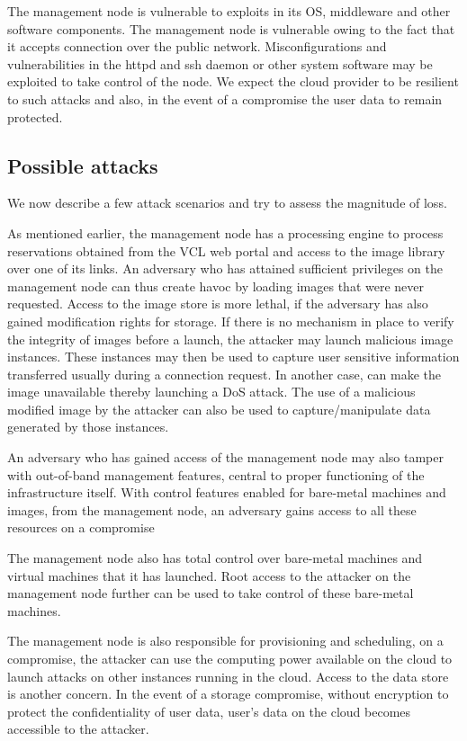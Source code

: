 \documentclass[10pt,twocolumn,pdftex]{article}
\begin{document}
The management node is vulnerable to exploits in its OS, middleware and other software components. The management node is vulnerable owing to the fact that it accepts connection over the public network. Misconfigurations and vulnerabilities in the httpd and ssh daemon or other system software may be exploited to take control of the node. We expect the cloud provider to be resilient to such attacks and also, in the event of a compromise the user data to remain protected.
\subsection{Possible attacks}
We now describe a few attack scenarios and try to assess the magnitude of loss.

As mentioned earlier, the management node has a processing engine to process reservations obtained from the VCL web portal and access to the image library over one of its links. An adversary who has attained sufficient privileges on the management node can thus create havoc by loading images that were never requested. Access to the image store is more lethal, if the adversary has also gained modification rights for storage. If there is no mechanism in place to verify the integrity of images before a launch, the attacker may launch malicious image instances. These instances may then be used to capture user sensitive information transferred usually during a connection request. In another case, can make the image unavailable thereby launching a DoS attack. The use of a malicious modified image by the attacker can also be used to capture/manipulate data generated by those instances.

An adversary who has gained access of the management node may also tamper with out-of-band management features, central to proper functioning of the infrastructure itself. With control features enabled for bare-metal machines and images, from the management node, an adversary gains access to all these resources on a compromise

The management node also has total control over bare-metal machines and virtual machines that it has launched. Root access to the attacker on the management node further can be used to take control of these bare-metal machines.

The management node is also responsible for provisioning and scheduling, on a compromise, the attacker can use the computing power available on the cloud to launch attacks on other instances running in the cloud.
Access to the data store is another concern. In the event of a storage compromise, without encryption to protect the confidentiality of user data, user's data on the cloud becomes accessible to the attacker.
\end{document}
